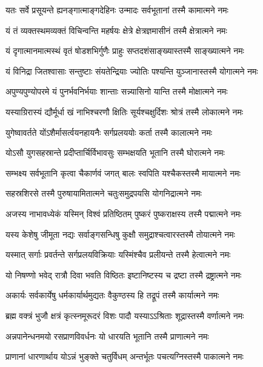 \twolineshloka
{यतः सर्वे प्रसूयन्ते ह्यनङ्गात्माङ्गदेहिनः}
{उन्मादः सर्वभूतानां तस्मै कामात्मने नमः} %


\twolineshloka
{यं तं व्यक्तस्थमव्यक्तं विचिन्वन्ति महर्षयः}
{क्षेत्रे क्षेत्रज्ञमासीनं तस्मै क्षेत्रात्मने नमः} %


\twolineshloka
{यं दृगात्मानमात्मस्थं वृतं षोडशभिर्गुणैः}
{प्राहुः सप्तदशंसाङ्ख्यास्तस्मै साङ्ख्यात्मने नमः} %


\twolineshloka
{यं विनिद्रा जितश्वासाः सन्तुष्टाः संयतेन्द्रियाः}
{ज्योतिः पश्यन्ति युञ्जानास्तस्मै योगात्मने नमः} %


\twolineshloka
{अपुण्यपुण्योपरमे यं पुनर्भवनिर्भयाः}
{शान्ताः सन्न्यासिनो यान्ति तस्मै मोक्षात्मने नमः} %


\twolineshloka
{यस्याग्रिरास्यं द्यौर्मूर्धा खं नाभिश्चरणौ क्षितिः}
{सूर्यश्चक्षुर्दिशः श्रोत्रं तस्मै लोकात्मने नमः} %


\twolineshloka
{युगेष्वावर्तते योंऽशैर्मासर्त्वयनहायनैः}
{सर्गप्रलययोः कर्ता तस्मै कालात्मने नमः} %


\twolineshloka
{योऽसौ युगसहस्रान्ते प्रदीप्तार्चिर्विभावसुः}
{सम्भक्षयति भूतानि तस्मै घोरात्मने नमः} %


\twolineshloka
{सम्भक्ष्य सर्वभूतानि कृत्वा चैकार्णवं जगत्}
{बालः स्वपिति यश्चैकस्तस्मै मायात्मने नमः} %


\twolineshloka
{सहस्रशिरसे तस्मै पुरुषायामितात्मने}
{चतुःसमुद्रपयसि योगनिद्रात्मने नमः} %


\twolineshloka
{अजस्य नाभावध्येकं यस्मिन् विश्वं प्रतिष्ठितम्}
{पुष्करं पुष्कराक्षस्य तस्मै पद्मात्मने नमः} %


\twolineshloka
{यस्य केशेषु जीमूता नद्यः सर्वाङ्गसन्धिषु}
{कुक्षौ समुद्राश्चत्वारस्तस्मै तोयात्मने नमः} %


\twolineshloka
{यस्मात् सर्गाः प्रवर्तन्ते सर्गप्रलयविक्रियाः}
{यस्मिंश्चैव प्रलीयन्ते तस्मै हेत्वात्मने नमः} %


\twolineshloka
{यो निषण्णो भवेद् रात्रौ दिवा भवति विष्ठितः}
{इष्टानिष्टस्य च द्रष्टा तस्मै द्रष्ट्रात्मने नमः} %


\twolineshloka
{अकार्यः सर्वकार्येषु धर्मकार्यार्थमुद्यतः}
{वैकुण्ठस्य हि तद्रूपं तस्मै कार्यात्मने नमः} %


\twolineshloka
{ब्रह्म वक्त्रं भुजौ क्षत्रं कृत्स्नमूरूदरं विशः}
{पादौ यस्याऽऽश्रिताः शूद्रास्तस्मै वर्णात्मने नमः} %


\twolineshloka
{अन्नपानेन्धनमयो रसप्राणविवर्धनः}
{यो धारयति भूतानि तस्मै प्राणात्मने नमः} %


\twolineshloka
{प्राणानां धारणार्थाय योऽन्नं भुङ्क्ते चतुर्विधम्}
{अन्तर्भूतः पचत्यग्निस्तस्मै पाकात्मने नमः} %


